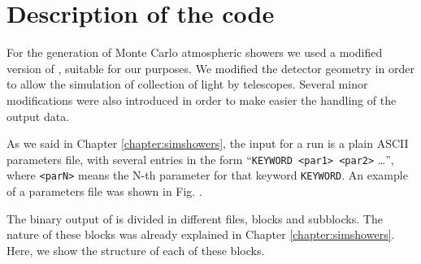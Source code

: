 %

\chapter{Description of the \CORSIKA code}
\label{appendix:corsika}

For the generation of Monte Carlo atmospheric showers we used a
modified version of , suitable for our purposes.  We
modified the detector geometry in order to allow the simulation of
collection of light by \Cherenkov telescopes. Several minor
modifications were also introduced in order to make easier the
handling of the output data.  

As we said in Chapter \ref{chapter:simshowers}, the input for a
\CORSIKA run is a plain ASCII parameters file, with several entries in
the form ``\texttt{KEYWORD <par1> <par2>} \ldots'', where \texttt{<parN>}
means the N-th parameter for that keyword \texttt{KEYWORD}. An example
of a parameters file was shown in Fig. .

The binary output of \CORSIKA is divided in different files, blocks
and subblocks. The nature of these blocks was already explained in
Chapter \ref{chapter:simshowers}. Here, we show the structure of each
of these blocks.

\CORSIKAtableRH

\CORSIKAtableRH

\CORSIKAtableEHone

\CORSIKAtableEHtwo

\CORSIKAtableEE

\CORSIKAtableRE

\CORSIKAtablePART

\CORSIKAtableCHER

\CORSIKAtableSTA


\endinput
%

